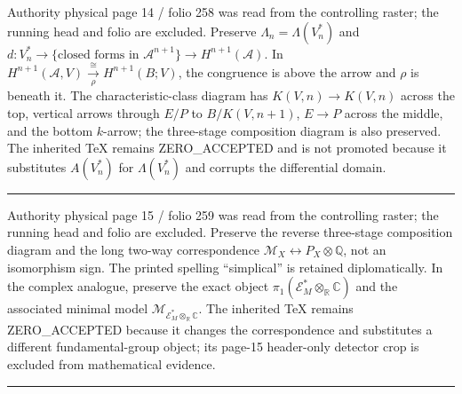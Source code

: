 \documentclass[
  english,
  a3paper,
  a3paper]{extarticle}
\begin{document}
Authority physical page 14 / folio 258 was read from the controlling
raster; the running head and folio are excluded. Preserve
\(\Lambda_n=\Lambda(V_n^*)\) and
\(d:V_n^*\to\{\text{closed forms in }\mathcal A^{n+1}\}\to H^{n+1}(\mathcal A)\).
In \(H^{n+1}(\mathcal A,V)\xrightarrow[\rho]{\cong}H^{n+1}(B;V)\), the
congruence is above the arrow and \(\rho\) is beneath it. The
characteristic-class diagram has \(K(V,n)\to K(V,n)\) across the top,
vertical arrows through \(E/P\) to \(B/K(V,n+1)\), \(E\to P\) across the
middle, and the bottom \(k\)-arrow; the three-stage composition diagram
is also preserved. The inherited TeX remains ZERO\_ACCEPTED and is not
promoted because it substitutes \(A(V_n^*)\) for \(\Lambda(V_n^*)\) and
corrupts the differential domain.

\clearpage



\par

\vspace{0.7mm}\hrule\vspace{1.6mm}

\fontsize{11}{14}\selectfont

Authority physical page 15 / folio 259 was read from the controlling
raster; the running head and folio are excluded. Preserve the reverse
three-stage composition diagram and the long two-way correspondence
\(\mathcal M_X\longleftrightarrow P_X\otimes\mathbb Q\), not an
isomorphism sign. The printed spelling ``simplical'' is retained
diplomatically. In the complex analogue, preserve the exact object
\(\pi_1(\mathcal E_M^*\otimes_{\mathbb R}\mathbb C)\) and the associated
minimal model
\(\mathcal M_{\mathcal E_M^*\otimes_{\mathbb R}\mathbb C}\). The
inherited TeX remains ZERO\_ACCEPTED because it changes the
correspondence and substitutes a different fundamental-group object; its
page-15 header-only detector crop is excluded from mathematical
evidence.

\clearpage



\par

\vspace{0.7mm}\hrule\vspace{1.6mm}
\end{document}
